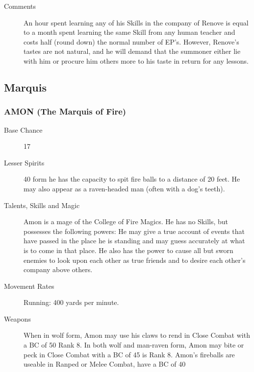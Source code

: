 \begin{multicols}{2}
\begin{description}
\item[Comments] An hour spent learning any of his Skills in the company of
Renove is equal to a month spent learning the same Skill from any
human teacher and costs half (round down) the normal number of
EP's. However, Renove's tastes are not natural, and he will demand
that the summoner either lie with him or procure him others more to
his taste in return for any lessons.

\end{description}

\subsection{Marquis}

\subsubsection{AMON (The Marquis of Fire)}

\begin{description}

\item[Base Chance] 17%

\item[Lesser Spirits]40%
form he has the capacity to spit fire balls to a distance of 20 feet.
He may also appear as a raven-headed man (often with a dog's teeth).

\item[Talents, Skills and Magic] Amon is a mage of the College of Fire Magics.  He has no
Skills, but possesses the following powers: He may give a true account
of events that have passed in the place he is standing and may guess
accurately at what is to come in that place.  He also has the power to
cause all but sworn enemies to look upon each other as true friends
and to desire each other's company above others.

\item[Movement Rates] Running: 400 yards per minute.

\item[Weapons] When in wolf form, Amon may use his claws to rend in Close
Combat with a BC of 50%
Rank 8.  In both wolf and man-raven form, Amon may bite or peck in
Close Combat with a BC of 45%
is Rank 8.  Amon's fireballs are useable in Ranped or Melee Combat,
have a BC of 40%


\end{description}
\end{multicols}
